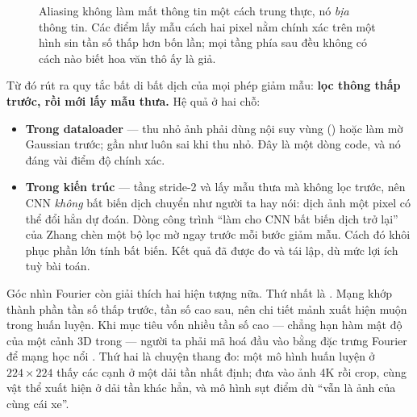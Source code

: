 \documentclass[../../../deep_learning.tex]{subfiles}
\begin{document}
\begin{figure}[H]\centering
{}
\caption{Aliasing không làm mất thông tin một cách trung thực, nó \emph{bịa} thông tin. Các điểm lấy mẫu cách hai pixel nằm chính xác trên một hình sin tần số thấp hơn bốn lần; mọi tầng phía sau đều không có cách nào biết hoa văn thô ấy là giả.}
\label{fig:aliasing}
\end{figure}


Từ đó rút ra quy tắc bất di bất dịch của mọi phép giảm mẫu: \textbf{lọc thông thấp trước, rồi mới lấy mẫu thưa.} Hệ quả ở hai chỗ:

\begin{itemize}
\item \textbf{Trong dataloader} --- thu nhỏ ảnh phải dùng nội suy vùng () hoặc làm mờ Gaussian trước;  gần như luôn sai khi thu nhỏ. Đây là một dòng code, và nó đáng vài điểm độ chính xác.
\item \textbf{Trong kiến trúc} --- tầng stride-2 và  lấy mẫu thưa mà không lọc trước, nên CNN \emph{không} bất biến dịch chuyển như người ta hay nói: dịch ảnh một pixel có thể đổi hẳn dự đoán. Dòng công trình ``làm cho CNN bất biến dịch trở lại'' của Zhang chèn một bộ lọc mờ ngay trước mỗi bước giảm mẫu. Cách đó khôi phục phần lớn tính bất biến. Kết quả đã được đo và tái lập, dù mức lợi ích tuỳ bài toán.
\end{itemize}

Góc nhìn Fourier còn giải thích hai hiện tượng nữa. Thứ nhất là . Mạng khớp thành phần tần số thấp trước, tần số cao sau, nên chi tiết mảnh xuất hiện muộn trong huấn luyện. Khi mục tiêu vốn nhiều tần số cao --- chẳng hạn hàm mật độ của một cảnh 3D trong  --- người ta phải mã hoá đầu vào bằng đặc trưng Fourier để mạng học nổi \cite{mildenhall2020nerf}. 
Thứ hai là chuyện thang đo: một mô hình huấn luyện ở \(224\times224\) thấy các cạnh ở một dải tần nhất định; đưa vào ảnh 4K rồi crop, cùng vật thể xuất hiện ở dải tần khác hẳn, và mô hình sụt điểm dù ``vẫn là ảnh của cùng cái xe''.
\end{document}
